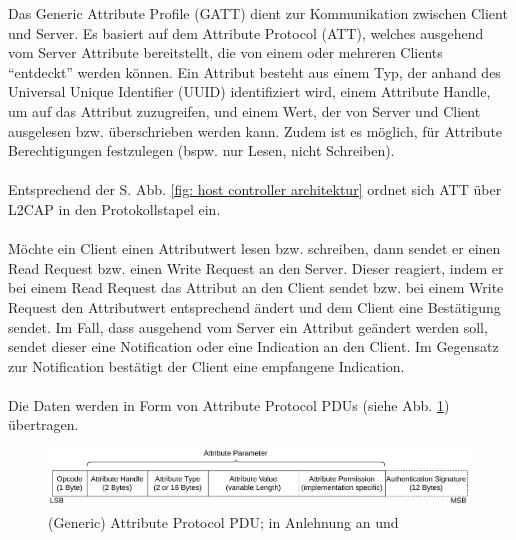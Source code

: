 Das Generic Attribute Profile (GATT) dient zur Kommunikation zwischen Client und Server. Es basiert auf dem Attribute Protocol (ATT), welches ausgehend vom Server Attribute bereitstellt, die von einem oder mehreren Clients "`entdeckt"' werden können. Ein Attribut besteht aus einem Typ, der anhand des Universal Unique Identifier (UUID) identifiziert wird, einem Attribute Handle, um auf das Attribut zuzugreifen, und einem Wert, der von Server und Client ausgelesen bzw. überschrieben werden kann. Zudem ist es möglich, für Attribute Berechtigungen festzulegen (bspw. nur Lesen, nicht Schreiben). \cite{BtSpec4.0_1835}
\\\\
Entsprechend der S. \pageref{fig: host controller architektur} Abb. \ref{fig: host controller architektur} ordnet sich ATT über L2CAP in den Protokollstapel ein.
\\\\
Möchte ein Client einen Attributwert lesen bzw. schreiben, dann sendet er einen Read Request bzw. einen Write Request an den Server. Dieser reagiert, indem er bei einem Read Request das Attribut an den Client sendet bzw. bei einem Write Request den Attributwert entsprechend ändert und dem Client eine Bestätigung sendet. Im Fall, dass ausgehend vom Server ein Attribut geändert werden soll, sendet dieser eine Notification oder eine Indication an den Client. Im Gegensatz zur Notification bestätigt der Client eine empfangene Indication. \cite{BtSpec4.0_1854-1855} \cite{BtSpec4.0_1861-1863}
\\\\
Die Daten werden in Form von Attribute Protocol PDUs (siehe Abb. \ref{fig: att pdu}) übertragen.

\begin{figure}[H]
    \centering
    \includegraphics[width=1\textwidth]{graphics/att_pdu.pdf}
    \caption[(Generic) Attribute Protocol PDU]{(Generic) Attribute Protocol PDU; in Anlehnung an \cite{BtSpec4.0_fig_1888} und \cite{BtSpec4.0_fig_1889}}
    \label{fig: att pdu}
\end{figure}

